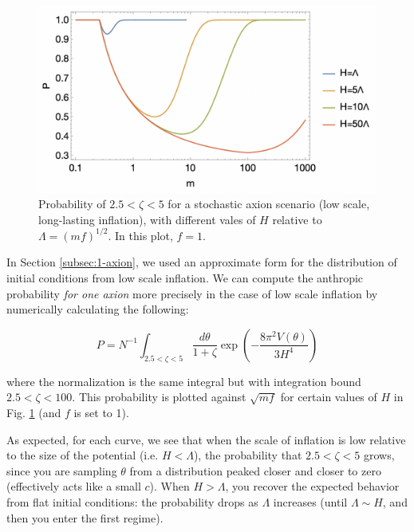 \documentclass[11pt]{article}
\begin{document}
\begin{figure}[h]
    \centering
    \includegraphics[width=1\linewidth]{figs/low-scale-inf-prob.jpeg}
    \caption{Probability of $2.5<\zeta<5$ for a stochastic axion scenario (low scale, long-lasting inflation), with different vales of $H$ relative to $\Lambda = (mf)^{1/2}$. In this plot, $f=1$.}
    \label{fig:low-scale-inf-prob}
\end{figure}

In Section \ref{subsec:1-axion}, we used an approximate form for the distribution of initial conditions from low scale inflation. We can compute the anthropic probability \textit{for one axion} more precisely in the case of low scale inflation by numerically calculating the following:

\begin{equation}
    \label{eq:inflation-prob-1axion}
    P = N^{-1}\int_{2.5<\zeta<5} \frac{d\theta}{1+\zeta} \exp{\left(-\frac{8\pi^2V(\theta)}{3H^4}\right)}
\end{equation}

\noindent where the normalization is the same integral but with integration bound $2.5<\zeta<100$. This probability is plotted against $\sqrt{mf}$ for certain values of $H$ in Fig. \ref{fig:low-scale-inf-prob} (and $f$ is set to 1).

As expected, for each curve, we see that when the scale of inflation is low relative to the size of the potential (i.e. $H<\Lambda$), the probability that $2.5<\zeta<5$ grows, since you are sampling $\theta$ from a distribution peaked closer and closer to zero (effectively acts like a small $c$). When $H>\Lambda$, you recover the expected behavior from flat initial conditions: the probability drops as $\Lambda$ increases (until $\Lambda \sim H$, and then you enter the first regime).
\end{document}
